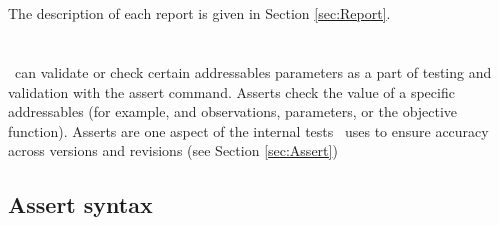  \pagebreak 
 \section{\label{syntax:Reports}}

The description of each report is given in Section \ref{sec:Report}.

\subsection{}



 \pagebreak 
 \section{\label{syntax:General}}



 \pagebreak 
 \section{}\label{syntax:Assert}

\CNAME\ can validate or check certain addressables parameters as a part of testing and validation with the assert command. Asserts check the value of a specific addressables (for example, and observations, parameters, or the objective function). Asserts are one aspect of the internal tests \CNAME\ uses to ensure accuracy across versions and revisions (see Section \ref{sec:Assert})

\subsection{Assert syntax}



